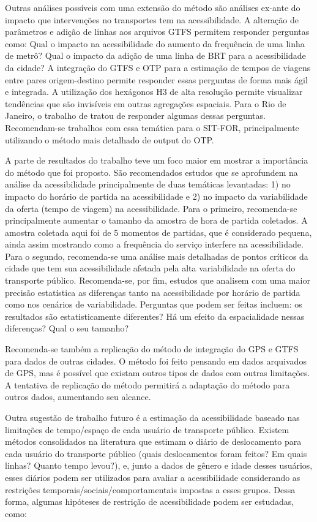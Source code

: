 \documentclass[        
    a4paper,          %
    12pt,             %
    chapter=TITLE,    %
    section=Title,    %
    subsection=Title, %
    oneside,          %
    english,          %
    spanish,          %
    brazil,           %
    fleqn             %
]{abntex2}
\begin{document}
  Outras análises possíveis com uma extensão do método são análises ex-ante do impacto que intervenções no transportes tem na acessibilidade. A alteração de parâmetros e adição de linhas aos arquivos GTFS permitem responder perguntas como: Qual o impacto na acessibilidade do aumento da frequência de uma linha de metrô? Qual o impacto da adição de uma linha de BRT para a acessibilidade da cidade? A integração do GTFS e OTP para a estimação de tempos de viagens entre pares origem-destino permite responder essas perguntas de forma mais ágil e integrada. A utilização dos hexágonos H3 de alta resolução permite visualizar tendências que são invisíveis em outras agregações espaciais. Para o Rio de Janeiro, o trabalho de \citet{Pereira2019} tratou de responder algumas dessas perguntas. Recomendam-se trabalhos com essa temática para o SIT-FOR, principalmente utilizando o método mais detalhado de output do OTP.
  
  A parte de resultados do trabalho teve um foco maior em mostrar a importância do método que foi proposto. São recomendados estudos que se aprofundem na análise da acessibilidade principalmente de duas temáticas levantadas: 1) no impacto do horário de partida na acessibilidade e 2) no impacto da variabilidade da oferta (tempo de viagem) na acessibilidade. Para o primeiro, recomenda-se principalmente aumentar o tamanho da amostra de hora de partida coletados. A amostra coletada aqui foi de 5 momentos de partidas, que é considerado pequena, ainda assim mostrando como a frequência do serviço interfere na acessibilidade. Para o segundo, recomenda-se uma análise mais detalhadas de pontos críticos da cidade que tem sua acessibilidade afetada pela alta variabilidade na oferta do transporte público. Recomenda-se, por fim, estudos que analisem com uma maior precisão estatística as diferenças tanto na acessibilidade por horário de partida como nos cenários de variabilidade. Perguntas que podem ser feitas incluem: os resultados são estatisticamente diferentes? Há um efeito da espacialidade nessas diferenças? Qual o seu tamanho?
  
  Recomenda-se também a replicação do método de integração do GPS e GTFS para dados de outras cidades. O método foi feito pensando em dados arquivados de GPS, mas é possível que existam outros tipos de dados com outras limitações. A tentativa de replicação do método permitirá a adaptação do método para outros dados, aumentando seu alcance.
  
  Outra sugestão de trabalho futuro é a estimação da acessibilidade baseado nas limitações de tempo/espaço de cada usuário de transporte público. Existem métodos consolidados na literatura \citep{Trepanier2007, Munizaga2012} que estimam o diário de deslocamento para cada usuário do transporte público (quais deslocamentos foram feitos? Em quais linhas? Quanto tempo levou?), e, junto a dados de gênero e idade desses usuários, esses diários podem ser utilizados para avaliar a acessibilidade considerando as restrições temporais/sociais/comportamentais impostas a esses grupos. Dessa forma, algumas hipóteses de restrição de acessibilidade podem ser estudadas, como:
  
\end{document}
